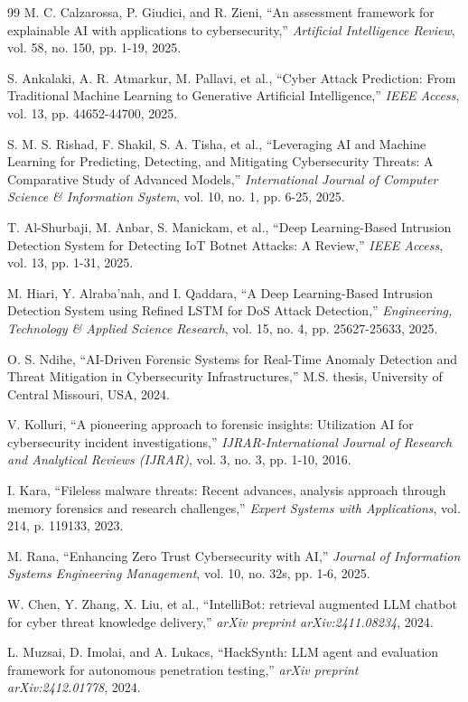 \documentclass[12pt,a4paper]{report}
\begin{document}
\begin{thebibliography}{99}
 M. C. Calzarossa, P. Giudici, and R. Zieni, ``An assessment framework for explainable AI with applications to cybersecurity,'' \textit{Artificial Intelligence Review}, vol. 58, no. 150, pp. 1-19, 2025.

 S. Ankalaki, A. R. Atmarkur, M. Pallavi, et al., ``Cyber Attack Prediction: From Traditional Machine Learning to Generative Artificial Intelligence,'' \textit{IEEE Access}, vol. 13, pp. 44652-44700, 2025.

 S. M. S. Rishad, F. Shakil, S. A. Tisha, et al., ``Leveraging AI and Machine Learning for Predicting, Detecting, and Mitigating Cybersecurity Threats: A Comparative Study of Advanced Models,'' \textit{International Journal of Computer Science \& Information System}, vol. 10, no. 1, pp. 6-25, 2025.

 T. Al-Shurbaji, M. Anbar, S. Manickam, et al., ``Deep Learning-Based Intrusion Detection System for Detecting IoT Botnet Attacks: A Review,'' \textit{IEEE Access}, vol. 13, pp. 1-31, 2025.

 M. Hiari, Y. Alraba'nah, and I. Qaddara, ``A Deep Learning-Based Intrusion Detection System using Refined LSTM for DoS Attack Detection,'' \textit{Engineering, Technology \& Applied Science Research}, vol. 15, no. 4, pp. 25627-25633, 2025.

 O. S. Ndihe, ``AI-Driven Forensic Systems for Real-Time Anomaly Detection and Threat Mitigation in Cybersecurity Infrastructures,'' M.S. thesis, University of Central Missouri, USA, 2024.

 V. Kolluri, ``A pioneering approach to forensic insights: Utilization AI for cybersecurity incident investigations,'' \textit{IJRAR-International Journal of Research and Analytical Reviews (IJRAR)}, vol. 3, no. 3, pp. 1-10, 2016.

 I. Kara, ``Fileless malware threats: Recent advances, analysis approach through memory forensics and research challenges,'' \textit{Expert Systems with Applications}, vol. 214, p. 119133, 2023.

 M. Rana, ``Enhancing Zero Trust Cybersecurity with AI,'' \textit{Journal of Information Systems Engineering Management}, vol. 10, no. 32s, pp. 1-6, 2025.

 W. Chen, Y. Zhang, X. Liu, et al., ``IntelliBot: retrieval augmented LLM chatbot for cyber threat knowledge delivery,'' \textit{arXiv preprint arXiv:2411.08234}, 2024.

 L. Muzsai, D. Imolai, and A. Lukacs, ``HackSynth: LLM agent and evaluation framework for autonomous penetration testing,'' \textit{arXiv preprint arXiv:2412.01778}, 2024.

\end{thebibliography}
\end{document}
